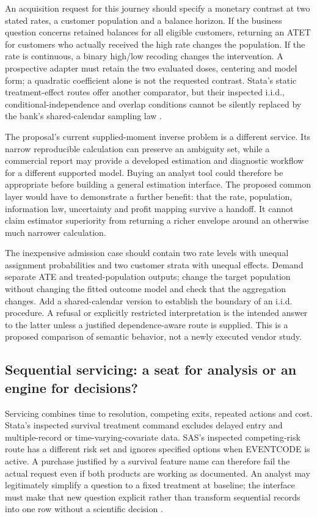 An acquisition request for this journey should specify a monetary contrast at
two stated rates, a customer population and a balance horizon. If the business
question concerns retained balances for all eligible customers, returning an
ATET for customers who actually received the high rate changes the population.
If the rate is continuous, a binary high/low recoding changes the intervention.
A prospective adapter must retain the two evaluated doses, centering and model
form; a quadratic coefficient alone is not the requested contrast. Stata's
static treatment-effect routes offer another comparator, but their inspected
i.i.d., conditional-independence and overlap conditions cannot be silently
replaced by the bank's shared-calendar sampling law
\citep{exec13_ci_stata_causal_intro,exec13_ch_jmp_causal}.

The proposal's current supplied-moment inverse problem is a different service.
Its narrow reproducible calculation can preserve an ambiguity set, while a
commercial report may provide a developed estimation and diagnostic workflow
for a different supported model. Buying an analyst tool could therefore be
appropriate before building a general estimation interface. The proposed
common layer would have to demonstrate a further benefit: that the rate,
population, information law, uncertainty and profit mapping survive a handoff.
It cannot claim estimator superiority from returning a richer envelope around
an otherwise much narrower calculation.

The inexpensive admission case should contain two rate levels with unequal
assignment probabilities and two customer strata with unequal effects. Demand
separate ATE and treated-population outputs; change the target population
without changing the fitted outcome model and check that the aggregation
changes. Add a shared-calendar version to establish the boundary of an i.i.d.
procedure. A refusal or explicitly restricted interpretation is the intended
answer to the latter unless a justified dependence-aware route is supplied.
This is a proposed comparison of semantic behavior, not a newly executed
vendor study.

\subsection{Sequential servicing: a seat for analysis or an engine for decisions?}

Servicing combines time to resolution, competing exits, repeated actions and
cost. Stata's inspected survival treatment command excludes delayed entry and
multiple-record or time-varying-covariate data. SAS's inspected competing-risk
route has a different risk set and ignores specified options when EVENTCODE
is active. A purchase justified by a survival feature name can therefore fail
the actual request even if both products are working as documented. An
analyst may legitimately simplify a question to a fixed treatment at baseline;
the interface must make that new question explicit rather than transform
sequential records into one row without a scientific decision
\citep{exec14_survival_stata,exec14_survival_sas}.

